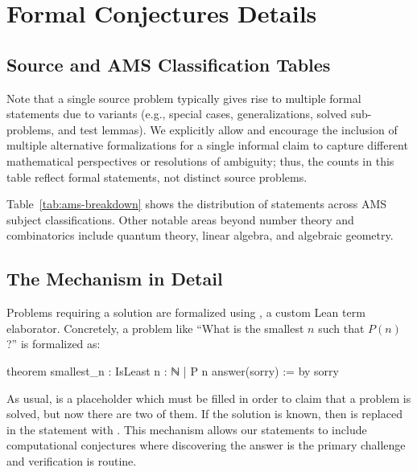 \section{Formal Conjectures Details}\label{sec:app_formal_conjectures}


\subsection{Source and AMS Classification Tables}\label{sec:app_source_ams_tables}

Note that a single source problem typically gives rise to multiple formal statements due to variants (e.g., special cases, generalizations, solved sub-problems, and test lemmas). We explicitly allow and encourage the inclusion of multiple alternative formalizations for a single informal claim to capture different mathematical perspectives or resolutions of ambiguity; thus, the counts in this table reflect formal statements, not distinct source problems.



Table~\ref{tab:ams-breakdown} shows the distribution of statements across AMS subject classifications.
Other notable areas beyond number theory and combinatorics include quantum theory, linear algebra, and algebraic geometry.



\subsection{The \texorpdfstring{}{answer(sorry)} Mechanism in Detail}\label{sec:app_answer_sorry}

Problems requiring a solution are formalized using , a custom Lean term elaborator.
Concretely, a problem like \enquote{What is the smallest $n$ such that $P(n)$?} is formalized as:
\begin{leancode}
theorem smallest_n : IsLeast {n : ℕ | P n} answer(sorry) := by
  sorry
\end{leancode}
As usual,  is a placeholder which must be filled in order to claim that a problem is solved, but now there are two of them.
If the solution is known, then  is replaced in the statement with .
This mechanism allows our statements to include computational conjectures where discovering the answer is the primary challenge and verification is routine.

